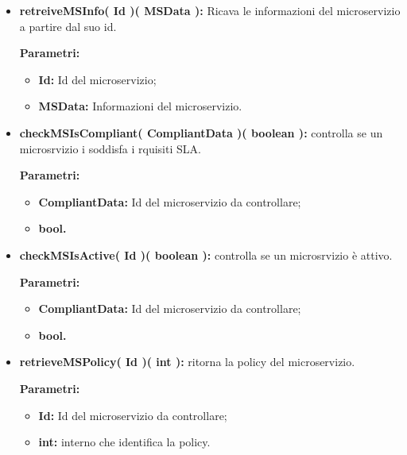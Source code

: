 \begin{itemize}
\begin{itemize}
			\item \textbf{retreiveMSInfo( Id )( MSData ):} Ricava le informazioni del microservizio a partire dal suo id.
				\begin{description}
    				\item[\textbf{Parametri:}]
				\end{description}
				\begin{itemize}
					\item \textbf{Id:} Id del microservizio;
					\item \textbf{MSData:} Informazioni del microservizio.
				\end{itemize}
				
			\item \textbf{checkMSIsCompliant( CompliantData )( boolean ):} controlla se un microsrvizio i soddisfa i rquisiti SLA. 
				\begin{description}
    				\item[\textbf{Parametri:}]
				\end{description}
				\begin{itemize}
					\item \textbf{CompliantData:} Id del microservizio da controllare;
					\item \textbf{bool.}
				\end{itemize}
			
			\item \textbf{checkMSIsActive( Id )( boolean ):} controlla se un microsrvizio è attivo. 
				\begin{description}
					\item[\textbf{Parametri:}]
				\end{description}
				\begin{itemize}
					\item \textbf{CompliantData:} Id del microservizio da controllare;
					\item \textbf{bool.}
				\end{itemize}
		
			\item \textbf{retrieveMSPolicy( Id )( int ):} ritorna la policy del microservizio. 
			\begin{description}
				\item[\textbf{Parametri:}]
			\end{description}
			\begin{itemize}
				\item \textbf{Id:} Id del microservizio da controllare;
				\item \textbf{int:} interno che identifica la policy.
			\end{itemize}


\end{itemize}
\end{itemize}
